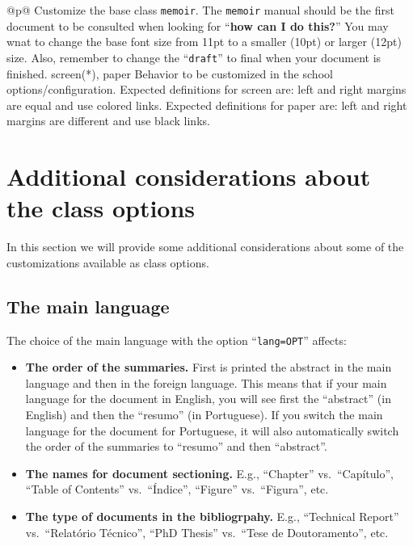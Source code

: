 \begin{ctabular}{@{}p{\linewidth}@{}}
    {Customize the base class \texttt{memoir}. The \texttt{memoir} manual should be the first document to be consulted when looking for “\textbf{how can I do this?}” You may wnat to change the base font size from 11pt to a smaller (10pt) or larger (12pt) size.  Also, remember to change the “\texttt{draft}” to final when your document is finished.}
    \midrule
    {screen(*), paper}%
    {Behavior to be customized in the school options/configuration. Expected definitions for screen are: left and right margins are equal and use colored links. Expected definitions for paper are: left and right margins are different and use black links.}
    \bottomrule
\end{ctabular}

\section{Additional considerations about the class options} %
\label{sec:additional_considerations}

In this section we will provide some additional considerations about some of the customizations available as class options.

\subsection{The main language} %
\label{sub:the_main_language}

The choice of the main language with the option “\texttt{lang=OPT}” affects:

\begin{itemize}
	\item \textbf{The order of the summaries.} First is printed the abstract in the main language and then in the foreign language. This means that if your main language for the document in English, you will see first the “abstract” (in English) and then the “resumo” (in Portuguese). If you switch the main language for the document for Portuguese, it will also automatically switch the order of the summaries to “resumo” and then “abstract”.
	\item \textbf{The names for document sectioning.} E.g., ``Chapter'' vs.\ ``Capítulo'', ``Table of Contents'' vs.\ ``Índice'', ``Figure'' vs.\ ``Figura'', etc.
	\item \textbf{The type of documents in the bibliogrpahy.} E.g., ``Technical Report'' vs.\ ``Relatório Técnico'', ``PhD Thesis'' vs.\ ``Tese de Doutoramento'', etc.
\end{itemize} 

